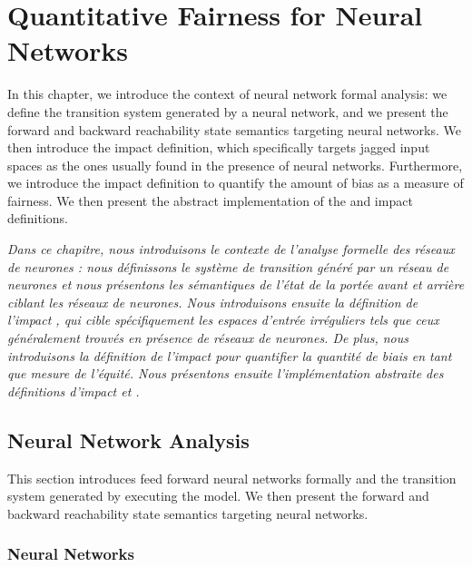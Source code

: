 \chapter{Quantitative Fairness for Neural Networks}

In this chapter, we introduce the context of neural network formal analysis: we define the transition system generated by a neural network, and we present the forward and backward reachability state semantics targeting neural networks. We then introduce the \changesname{} impact definition, which specifically targets jagged input spaces as the ones usually found in the presence of neural networks.
Furthermore, we introduce the \qlibraname{} impact definition to quantify the amount of bias as a measure of fairness. We then present the abstract implementation of the \changesname{} and \qlibraname{} impact definitions.

\emph{Dans ce chapitre, nous introduisons le contexte de l'analyse formelle des réseaux de neurones : nous définissons le système de transition généré par un réseau de neurones et nous présentons les sémantiques de l'état de la portée avant et arrière ciblant les réseaux de neurones. Nous introduisons ensuite la définition de l'impact \changesname{}, qui cible spécifiquement les espaces d'entrée irréguliers tels que ceux généralement trouvés en présence de réseaux de neurones. De plus, nous introduisons la définition de l'impact \qlibraname{} pour quantifier la quantité de biais en tant que mesure de l'équité. Nous présentons ensuite l'implémentation abstraite des définitions d'impact \changesname{} et \qlibraname{}.}

% 
% 
% 
% 
% 

\section{Neural Network Analysis}

This section introduces feed forward neural networks formally and the transition system generated by executing the model. We then present the forward and backward reachability state semantics targeting neural networks.

\subsection{Neural Networks}


